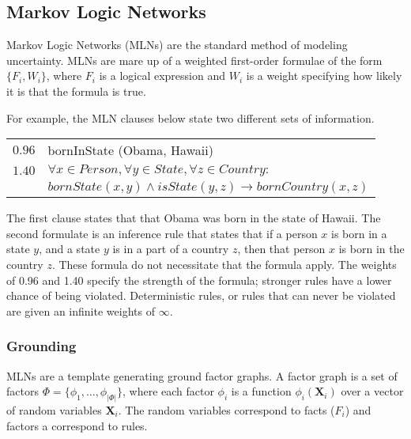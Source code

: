 \subsection{Markov Logic Networks}

Markov Logic Networks (MLNs) are the standard method of modeling uncertainty.
MLNs are mare up of a weighted first-order formulae of the form \(\{F_i, W_i\}\),
where \(F_i\) is a logical expression and \(W_i\) is a weight
specifying how likely it is that the formula is true.

For example, the MLN clauses below state two different sets of information.

\noindent\begin{tabular}{l l}
  \(0.96\) & bornInState (Obama, Hawaii) \\
  \(1.40\) & \( \forall x \in Person, \forall y \in State, \forall z \in Country: \) \\
           & \(bornState(x,y) \wedge isState(y,z) \rightarrow bornCountry(x, z)\)
\end{tabular}

The first clause states that that Obama was born in the state of Hawaii.
The second formulate is an inference rule that states that if a person \(x\) is born in a state \(y\), and a state \(y\) is in a part of a country \(z\),
then that person \(x\) is born in the country \(z\).
These formula do not necessitate that the formula apply.
The weights of 0.96 and 1.40 specify the strength of the formula; stronger rules have a lower chance of being violated.
Deterministic rules, or rules that can never be violated are given an infinite weights of \(\infty\).


\subsubsection{Grounding}

MLNs are a template generating ground factor graphs.
A factor graph is a set of factors \(\Phi = \{ \phi_1, \ldots, \phi_{|\Phi|} \} \),
where each factor \(\phi_i\) is a function \(\phi_i (\mathbf{X}_i)\) over a
vector of random variables \(\mathbf{X}_i\).
The random variables correspond to facts (\(F_i\)) and factors a correspond to rules.

